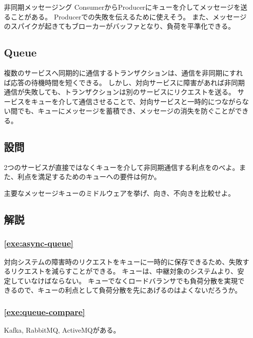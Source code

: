 \documentclass{jlreq}
\begin{document}
\begin{section-bib}{非同期メッセージング}
  ConsumerからProducerにキューを介してメッセージを送ることがある\cite{microsoft-messaging}。
  Producerでの失敗を伝えるために使えそう。
  また、メッセージのスパイクが起きてもブローカーがバッファとなり、負荷を平準化できる。
  \subsection{Queue}
  複数のサービスへ同期的に通信するトランザクションは、通信を非同期にすれば応答の待機時間を短くできる。
  しかし、対向サービスに障害があれば非同期通信が失敗しても、トランザクションは別のサービスにリクエストを送る。
  サービスをキューを介して通信させることで、対向サービスと一時的につながらない間でも、キューにメッセージを蓄積でき、メッセージの消失を防ぐことができる\cite{lc-isc}。
  \subsection{設問}
  \begin{exercise}
  \item 2つのサービスが直接ではなくキューを介して非同期通信する利点をのべよ。また、利点を満足するためのキューへの要件は何か。\label{exe:async-queue}
  \item 主要なメッセージキューのミドルウェアを挙げ、向き、不向きを比較せよ。\label{exe:queue-compare}
  \end{exercise}
  \subsection{解説}
  \subsubsection*{\ref{exe:async-queue}}
  対向システムの障害時のリクエストをキューに一時的に保存できるため、失敗するリクエストを減らすことができる\cite{lc-isc}。
  キューは、中継対象のシステムより、安定していなけばならない。
  キューでなくロードバランサでも負荷分散を実現できるので、キューの利点として負荷分散を先にあげるのはよくないだろうか。
  \subsubsection*{\ref{exe:queue-compare}}
  Kafka, RabbitMQ, ActiveMQがある\cite{lc-isc}。
\end{section-bib}
\end{document}

